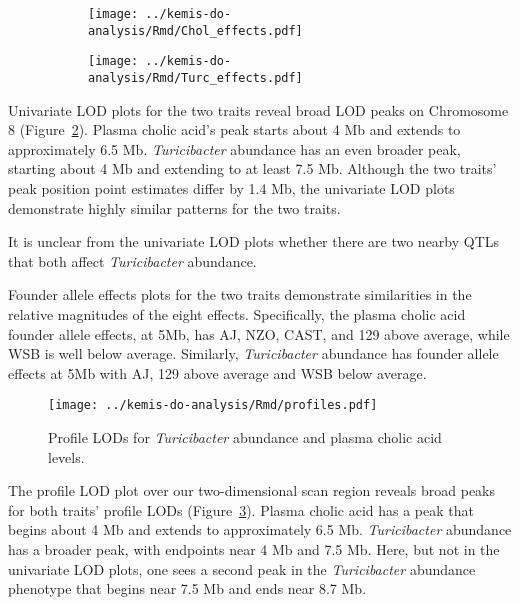 \documentclass[oneside]{book}
\begin{document}
\begin{figure}
\begin{subfigure}[b]{\textwidth}
\centering
\texttt{[image: ../kemis-do-analysis/Rmd/Chol\_effects.pdf]}
\end{subfigure}

\begin{subfigure}[b]{\textwidth}
\centering
\texttt{[image: ../kemis-do-analysis/Rmd/Turc\_effects.pdf]}
\label{fig:3c-effects}
\end{subfigure}
\end{figure}

Univariate LOD plots for the two traits reveal broad LOD peaks on Chromosome 8 (Figure~\ref{fig:3c-effects}). Plasma cholic acid's peak starts about 4 Mb and extends to approximately 6.5 Mb. \emph{Turicibacter} abundance has an even broader peak, starting about 4 Mb and extending to at least 7.5 Mb. Although the two traits' peak position point estimates differ by 1.4 Mb, the univariate LOD plots demonstrate highly similar patterns for the two traits.

It is unclear from the univariate LOD plots whether there are two nearby QTLs that both affect \emph{Turicibacter} abundance. 

Founder allele effects plots for the two traits demonstrate similarities in the relative magnitudes of the eight effects. Specifically, the plasma cholic acid founder allele effects, at 5Mb, has AJ, NZO, CAST, and 129 above average, while WSB is well below average. Similarly, \emph{Turicibacter} abundance has founder allele effects at 5Mb with AJ, 129 above average and WSB below average.


\begin{figure}
\texttt{[image: ../kemis-do-analysis/Rmd/profiles.pdf]}
\caption{Profile LODs for \emph{Turicibacter} abundance and plasma cholic acid levels.}\label{fig:3c-profile}
\end{figure}

The profile LOD plot over our two-dimensional scan region reveals broad peaks for both traits' profile LODs (Figure~\ref{fig:3c-profile}). Plasma cholic acid has a peak that begins about 4 Mb and extends to approximately 6.5 Mb. \emph{Turicibacter} abundance has a broader peak, with endpoints near 4 Mb and 7.5 Mb. Here, but not in the univariate LOD plots, one sees a second peak in the \emph{Turicibacter} abundance phenotype that begins near 7.5 Mb and ends near 8.7 Mb. 
\end{document}
